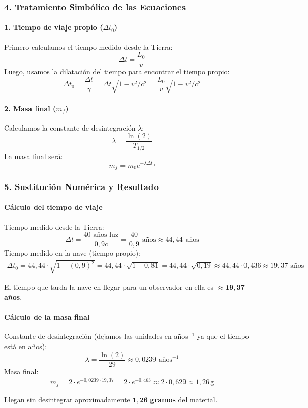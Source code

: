 \subsubsection*{4. Tratamiento Simbólico de las Ecuaciones}
\paragraph*{1. Tiempo de viaje propio ($\Delta t_0$)}
Primero calculamos el tiempo medido desde la Tierra:
$$\Delta t = \frac{L_0}{v}$$
Luego, usamos la dilatación del tiempo para encontrar el tiempo propio:
$$\Delta t_0 = \frac{\Delta t}{\gamma} = \Delta t \sqrt{1-v^2/c^2} = \frac{L_0}{v}\sqrt{1-v^2/c^2}$$

\paragraph*{2. Masa final ($m_f$)}
Calculamos la constante de desintegración $\lambda$:
$$\lambda = \frac{\ln(2)}{T_{1/2}}$$
La masa final será:
$$m_f = m_0 e^{-\lambda \Delta t_0}$$

\subsubsection*{5. Sustitución Numérica y Resultado}
\paragraph*{Cálculo del tiempo de viaje}
Tiempo medido desde la Tierra:
$$\Delta t = \frac{40 \text{ años-luz}}{0,9c} = \frac{40}{0,9} \text{ años} \approx 44,44 \text{ años}$$
Tiempo medido en la nave (tiempo propio):
\begin{gather}
    \Delta t_0 = 44,44 \cdot \sqrt{1 - (0,9)^2} = 44,44 \cdot \sqrt{1 - 0,81} = 44,44 \cdot \sqrt{0,19} \approx 44,44 \cdot 0,436 \approx 19,37 \text{ años}
\end{gather}
\begin{cajaresultado}
    El tiempo que tarda la nave en llegar para un observador en ella es $\boldsymbol{\approx 19,37}$ \textbf{años}.
\end{cajaresultado}

\paragraph*{Cálculo de la masa final}
Constante de desintegración (dejamos las unidades en años$^{-1}$ ya que el tiempo está en años):
$$\lambda = \frac{\ln(2)}{29} \approx 0,0239 \text{ años}^{-1}$$
Masa final:
\begin{gather}
    m_f = 2 \cdot e^{-0,0239 \cdot 19,37} = 2 \cdot e^{-0,463} \approx 2 \cdot 0,629 \approx 1,26 \, \text{g}
\end{gather}
\begin{cajaresultado}
    Llegan sin desintegrar aproximadamente $\boldsymbol{1,26}$ \textbf{gramos} del material.
\end{cajaresultado}

